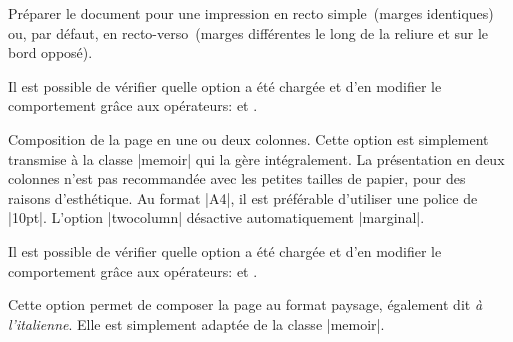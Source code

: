 Préparer le document pour une impression en recto simple~(marges identiques) ou, par défaut, en recto-verso~(marges différentes le long de la reliure et sur le bord opposé).

\begin{developer}
Il est possible de vérifier quelle option a été chargée et d'en modifier le comportement grâce aux opérateurs:  et .
\end{developer}

\begin{noprint}
\end{noprint}

Composition de la page en une ou deux colonnes. Cette option est simplement transmise à la classe |memoir| qui la gère intégralement. La présentation en deux colonnes n'est pas recommandée avec les petites tailles de papier, pour des raisons d'esthétique. Au format |A4|, il est préférable d'utiliser une police de |10pt|. L'option |twocolumn| désactive automatiquement |marginal|.

\begin{developer}
Il est possible de vérifier quelle option a été chargée et d'en modifier le comportement grâce aux opérateurs:  et .
\end{developer}

Cette option permet de composer la page au format paysage, également dit \emph{à l'italienne}. Elle est simplement adaptée de la classe |memoir|.

